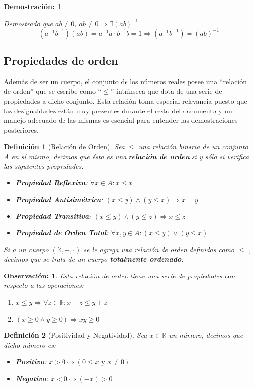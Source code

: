 \documentclass[10pt,a4paper,openright]{book}
\theoremstyle{break}
\newtheorem*{defi}{Definición}
\newtheorem*{demo}{\underline{Demostración}:}
\newtheorem*{obs}{\underline{Observación}:}
\begin{document}
\begin{demo}
\begin{enumerate}
Demostrado que $ab\neq 0$, $ab\neq 0\Rightarrow \exists (ab)^{-1}$
$$(a^{-1}b^{-1})(ab)=a^{-1} a \cdot b^{-1} b=1 \Rightarrow (a^{-1}b^{-1})=(ab)^{-1}$$
\end{enumerate}
\end{demo}

\subsection{Propiedades de orden}
Además de ser un cuerpo, el conjunto de los números reales posee una ``relación de orden'' que se escribe como ``$\leq$'' intrínseca que dota de una serie de propiedades a dicho conjunto. Esta relación toma especial relevancia puesto que las desigualdades están muy presentes durante el resto del documento y un manejo adecuado de las mismas es esencial para entender las demostraciones posteriores.

\begin{defi}[Relación de Orden]
Sea $\leq$ una relación binaria de un conjunto $A$ en sí mismo, decimos que ésta es una \textbf{relación de orden} si y sólo si verifica las siguientes propiedades:
\begin{itemize}
\item \textbf{Propiedad Reflexiva}: $\forall x\in  A: x \leq x$
\item \textbf{Propiedad Antisimétrica}: $(x\leq y) \wedge (y\leq x) \Rightarrow x=y$
\item \textbf{Propiedad Transitiva}: $(x\leq y) \wedge (y \leq z) \Rightarrow x\leq z$
\item \textbf{Propiedad de Orden Total}: $\forall x,y\in A: (x\leq y) \vee (y\leq x)$
\end{itemize}
Si a un cuerpo $(\mathbb K, +, \cdot)$ se le agrega una relación de orden definidas como $\leq$ , decimos que se trata de un cuerpo \textbf{totalmente ordenado}. 
\end{defi}

\begin{obs}
Esta relación de orden tiene una serie de propiedades con respecto a las operaciones:
\begin{enumerate}
\item $x\leq y \Rightarrow \forall z \in \mathbb R : x+z\leq y+z$
\item $(x\geq 0 \wedge y \geq 0)\Rightarrow xy\geq 0$
\end{enumerate}
\end{obs}

\begin{defi}[Positividad y Negatividad]
Sea $x\in \mathbb{R}$ un número, decimos que dicho número es:
\begin{itemize}
\item \textbf{Positivo}: $ x> 0 \Leftrightarrow (0\leq x \mbox{ y } x\neq 0)$
\item \textbf{Negativo}: $ x < 0 \Leftrightarrow (-x)>0$
\end{itemize}
\end{defi}
\end{document}
